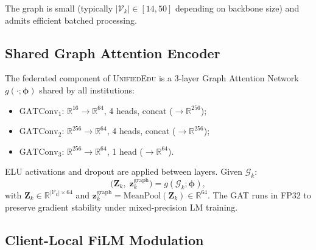 \documentclass[11pt]{article}
\theoremstyle{plain}
\theoremstyle{definition}
\theoremstyle{remark}
\newcommand{\UniEdu}{\textsc{UnifiedEdu}}
\begin{document}
The graph is small (typically $|\mathcal{V}_k| \in
[14, 50]$ depending on backbone size) and admits
efficient batched processing.

\subsection{Shared Graph Attention Encoder}
\label{sec:gnn}

The federated component of \UniEdu{} is a 3-layer
Graph Attention Network~\citep{velickovic2018graph}
$g(\cdot;\boldsymbol{\phi})$ shared by all
institutions:
\begin{itemize}[leftmargin=1.5em, itemsep=1pt]
  \item $\mathrm{GATConv}_1$: $\mathbb{R}^{16}{\to}
  \mathbb{R}^{64}$, 4 heads, concat ($\to
  \mathbb{R}^{256}$);
  \item $\mathrm{GATConv}_2$: $\mathbb{R}^{256}{\to}
  \mathbb{R}^{64}$, 4 heads, concat ($\to
  \mathbb{R}^{256}$);
  \item $\mathrm{GATConv}_3$: $\mathbb{R}^{256}{\to}
  \mathbb{R}^{64}$, 1 head ($\to \mathbb{R}^{64}$).
\end{itemize}
ELU activations and dropout are applied between
layers. Given $\mathcal{G}_k$:
\begin{equation}
  \bigl(\mathbf{Z}_k,\;\mathbf{z}_k^{\text{graph}}\bigr)
  = g(\mathcal{G}_k;\boldsymbol{\phi}),
  \label{eq:gnn_forward}
\end{equation}
with $\mathbf{Z}_k \in \mathbb{R}^{|\mathcal{V}_k|
\times 64}$ and $\mathbf{z}_k^{\text{graph}} =
\mathrm{MeanPool}(\mathbf{Z}_k) \in \mathbb{R}^{64}$.
The GAT runs in FP32 to preserve gradient stability
under mixed-precision LM training.

\subsection{Client-Local FiLM Modulation}
\label{sec:film}
\end{document}
